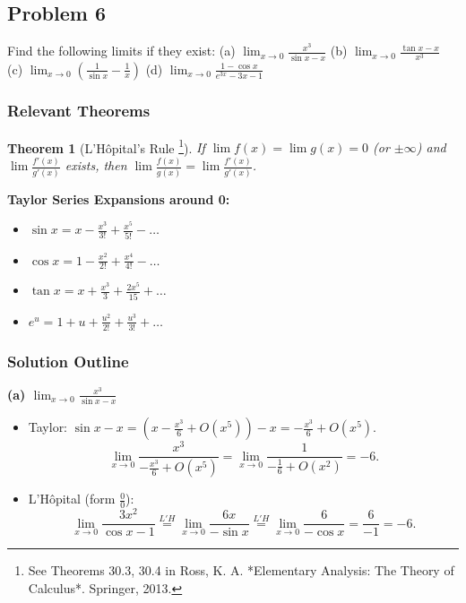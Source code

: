 \documentclass{article}
\newtheorem*{theorem}{Theorem}
\begin{document}
\hrulefill

\subsection*{Problem 6}

Find the following limits if they exist:
(a) \(\lim_{x\to 0} \frac{x^3}{\sin x - x}\)
(b) \(\lim_{x\to 0} \frac{\tan x -x}{x^3}\)
(c) \(\lim_{x\to 0} \left( \frac{1}{\sin x} - \frac{1}{x} \right)\)
(d) \(\lim_{x\to 0} \frac{1-\cos x}{e^{3x}-3x-1}\)

\subsubsection*{Relevant Theorems}

\begin{theorem}[L'Hôpital's Rule \footnote{See Theorems 30.3, 30.4 in Ross, K. A. *Elementary Analysis: The Theory of Calculus*. Springer, 2013.}]
If \(\lim f(x) = \lim g(x) = 0\) (or \(\pm \infty\)) and \(\lim \frac{f'(x)}{g'(x)}\) exists, then \(\lim \frac{f(x)}{g(x)} = \lim \frac{f'(x)}{g'(x)}\).
\end{theorem}

\textbf{Taylor Series Expansions around 0:}
\begin{itemize}
    \item \(\sin x = x - \frac{x^3}{3!} + \frac{x^5}{5!} - \dots\)
    \item \(\cos x = 1 - \frac{x^2}{2!} + \frac{x^4}{4!} - \dots\)
    \item \(\tan x = x + \frac{x^3}{3} + \frac{2x^5}{15} + \dots\)
    \item \(e^u = 1 + u + \frac{u^2}{2!} + \frac{u^3}{3!} + \dots\)
\end{itemize}

\subsubsection*{Solution Outline}

\textbf{(a) \(\lim_{x\to 0} \frac{x^3}{\sin x - x}\)}
\begin{itemize}
    \item Taylor: \(\sin x - x = (x - \frac{x^3}{6} + O(x^5)) - x = -\frac{x^3}{6} + O(x^5)\).
    \[ \lim_{x\to 0} \frac{x^3}{-\frac{x^3}{6} + O(x^5)} = \lim_{x\to 0} \frac{1}{-\frac{1}{6} + O(x^2)} = -6. \]
    \item L'Hôpital (form \(\tfrac{0}{0}\)):
    \[ \lim_{x\to 0} \frac{3x^2}{\cos x - 1} \overset{L'H}{=} \lim_{x\to 0} \frac{6x}{-\sin x} \overset{L'H}{=} \lim_{x\to 0} \frac{6}{-\cos x} = \frac{6}{-1} = -6. \]
\end{itemize}
\end{document}
